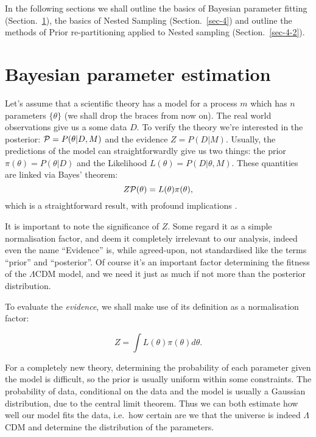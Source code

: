 \documentclass[12pt]{article}
\begin{document}
In the following sections we shall outline the basics of Bayesian
parameter fitting (Section.~\ref{sec-2}), the basics of Nested
Sampling (Section.~\ref{sec-4}) and outline the methods of Prior
re-partitioning applied to Nested sampling (Section.~\ref{sec-4-2}).
\goodbreak%
\section{Bayesian parameter estimation}\label{sec-2}

Let's assume that a scientific theory has a model for a process \(m \)
which has \( n \) parameters \( \lbrace \theta \rbrace \) (we shall drop the braces
from now on). The real world observations give us a some data \( D
\). To verify the theory we're interested in the posterior:
\( {\cal P} = P(\theta | D, M) \) and the evidence
\( Z = P ( D | M ) \). Usually, the predictions of the model can
straightforwardly give us two things: the prior
\( \pi (\theta) = P (\theta | D)\) and the Likelihood
\( L(\theta) = P ( D | \theta, M) \). These quantities are linked via Bayes'
theorem: \[ Z {\cal P}(\theta) = L (\theta) \pi(\theta), \] which is a straightforward
result, with profound implications
\autocite[p.~31]{jeffreys2010scientific}.

It is important to note the significance of \( Z
\). Some\autocite[p.~32]{jeffreys2010scientific} regard it as a simple
normalisation factor, and deem it completely irrelevant to our
analysis, indeed even the name ``Evidence'' is, while agreed-upon, not
standardised like the terms ``prior'' and ``posterior''. Of course
it's an important factor determining the fitness of the $\Lambda$CDM model,
and we need it just as much if not more than the posterior
distribution.

To evaluate the \emph{evidence}, we shall make use of its definition
as a normalisation factor:

\begin{equation}
Z  = \int L (\theta) \pi (\theta) d \theta.
\end{equation}

For a completely new theory, determining the probability of each
parameter given the model is difficult, so the prior is usually
uniform within some
constraints\autocite{skilling2006, polychord}. The probability of
data, conditional on the data and the model is usually a Gaussian
distribution, due to the central limit theorem.  Thus we can both
estimate how well our model fits the data, i.e.~how certain are we
that the universe is indeed $\Lambda$CDM and determine the distribution of
the parameters.
\end{document}
